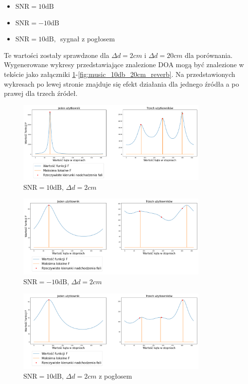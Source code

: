 \begin{itemize}
    \item $\mathrm{SNR}=10\mathrm{dB}$ 
    \item $\mathrm{SNR}=-10\mathrm{dB}$
    \item $\mathrm{SNR}=10\mathrm{dB}, \, $ sygnał z pogłosem
\end{itemize}

\noindent Te wartości zostały sprawdzone dla $\Delta d = 2cm$ i $\Delta d = 20cm$ dla porównania. Wygenerowane wykresy przedstawiające znalezione DOA mogą być znalezione w tekście jako załączniki \ref{fig:music_10db_2cm}-\ref{fig:music_10db_20cm_reverb}. Na przedstawionych wykresach po lewej stronie znajduje się efekt działania dla jednego źródła a po prawej dla trzech źródeł.

\begin{figure}[H]
    \centering
    \includegraphics[width=0.85\textwidth]{Images/music_10db.png}
    \caption{$\mathrm{SNR}=10\mathrm{dB}, \, \Delta d = 2cm$}
    \label{fig:music_10db_2cm}
\end{figure}

\begin{figure}[H]
    \centering
    \includegraphics[width=0.85\textwidth]{Images/music_-10db.png}
    \caption{$\mathrm{SNR}=-10\mathrm{dB}, \, \Delta d = 2cm$}
    \label{fig:music_-10db_2cm}
\end{figure}

\begin{figure}[H]
    \centering
    \includegraphics[width=0.85\textwidth]{Images/music_10db_reverb.png}
    \caption{$\mathrm{SNR}=10\mathrm{dB}, \, \Delta d = 2cm$ z pogłosem}
    \label{fig:music_10db_2cm_reverb}
\end{figure}

